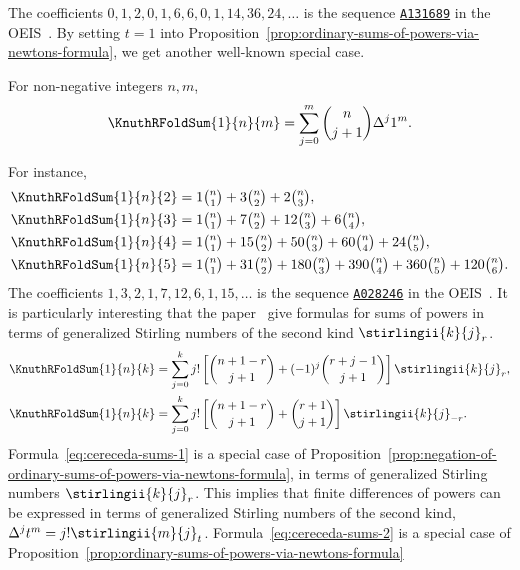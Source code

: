 The coefficients $0,1,2,0, 1, 6, 6, 0, 1, 14, 36, 24, \dots$ is the sequence
\href{https://oeis.org/A131689}{\texttt{A131689}}
in the OEIS~\cite{sloane2003line}.
By setting $t=1$ into
Proposition~\eqref{prop:ordinary-sums-of-powers-via-newtons-formula}, we get
another well-known special case.
\begin{corollary}
  For non-negative integers $n,m$,
  \begin{align*}
    \KnuthRFoldSum{1}{n}{m} = \sum_{j=0}^{m} \binom{n}{j+1} \Delta^{j} 1^m.
  \end{align*}
\end{corollary}
For instance,
\begin{align*}
  \KnuthRFoldSum{1}{n}{2} &= 1 \tbinom{n}{1} + 3 \tbinom{n}{2}
  +2   \tbinom{n}{3},
  \\
  \KnuthRFoldSum{1}{n}{3} &= 1 \tbinom{n}{1} + 7 \tbinom{n}{2}
  +12  \tbinom{n}{3} + 6  \tbinom{n}{4},
  \\
  \KnuthRFoldSum{1}{n}{4} &= 1 \tbinom{n}{1} +15 \tbinom{n}{2}
  +50  \tbinom{n}{3} +60  \tbinom{n}{4} + 24 \tbinom{n}{5},
  \\
  \KnuthRFoldSum{1}{n}{5} &= 1 \tbinom{n}{1} +31 \tbinom{n}{2}
  +180 \tbinom{n}{3} +390 \tbinom{n}{4} + 360 \tbinom{n}{5}
  + 120 \tbinom{n}{6}.
\end{align*}
The coefficients $1,3,2,1,7,12,6,1,15, \dots$ is the sequence
\href{https://oeis.org/A028246}{\texttt{A028246}}
in the OEIS~\cite{sloane2003line}.
It is particularly interesting that the paper~\cite{cereceda2022sums}
give formulas for sums of powers
in terms of generalized Stirling numbers of
the second kind $\stirlingii{k}{j}_{r}$.
\begin{align}
  \KnuthRFoldSum{1}{n}{k} &= \sum_{j=0}^{k} j!
  \left[
    \binom{n+1-r}{j+1} + (-1)^j \binom{r+j-1}{j+1}
  \right] \stirlingii{k}{j}_{r},
  \label{eq:cereceda-sums-1}
  \\
  \KnuthRFoldSum{1}{n}{k} &= \sum_{j=0}^{k} j!
  \left[
    \binom{n+1-r}{j+1} + \binom{r+1}{j+1}
  \right] \stirlingii{k}{j}_{-r}.
  \label{eq:cereceda-sums-2}
\end{align}
Formula~\eqref{eq:cereceda-sums-1}
is a special case of
Proposition~\eqref{prop:negation-of-ordinary-sums-of-powers-via-newtons-formula},
in terms of generalized Stirling numbers $\stirlingii{k}{j}_{r}$.
This implies that finite differences of powers can be expressed
in terms of generalized Stirling numbers of the second kind,
$\Delta^{j} t^m = j! \stirlingii{m}{j}_{t}$.
Formula~\eqref{eq:cereceda-sums-2} is a special case
of Proposition~\eqref{prop:ordinary-sums-of-powers-via-newtons-formula}
